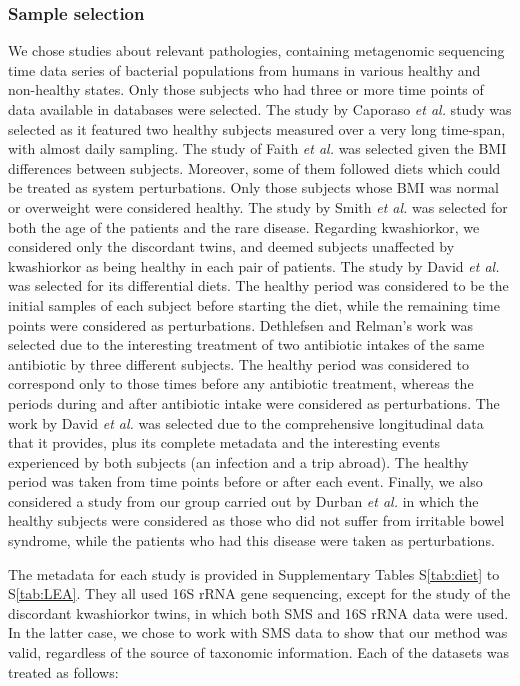 \subsubsection*{Sample selection}
We chose studies about relevant pathologies, containing metagenomic sequencing time data series of bacterial populations from humans in various healthy and non-healthy states. Only those subjects who had three or more time points of data available in databases were selected. The study by Caporaso \textit{et al.} study \cite{moving} was selected as it featured two healthy subjects measured over a very long time-span, with almost daily sampling. The study of Faith \textit{et al.} \cite{LEA} was selected given the BMI differences between subjects. Moreover, some of them followed diets which could be treated as system perturbations. Only those subjects whose BMI was normal or overweight were considered healthy. The study by Smith \textit{et al.} \cite{kwashiorkor} was selected for both the age of the patients and the rare disease. Regarding kwashiorkor, we considered only the discordant twins, and deemed subjects unaffected by kwashiorkor as being healthy in each pair of patients. The study by David \textit{et al.} \cite{diet} was selected for its differential diets. The healthy period  was considered to be the initial samples of each subject before starting the diet, while the remaining time points were considered as perturbations. Dethlefsen and Relman’s work \cite{antibiotic} was selected due to the interesting treatment of two antibiotic intakes of the same antibiotic by three different subjects. The healthy period was considered to correspond only to those times before any antibiotic treatment, whereas the periods during and after antibiotic intake were considered as perturbations. The work by David \textit{et al.} \cite{hostlife} was selected due to the comprehensive longitudinal data that it provides, plus its complete metadata and the interesting events experienced by both subjects (an infection and a trip abroad). The healthy period was taken from time points before or after each event. Finally, we also considered a study from our group carried out by Durban \textit{et al.} \cite{IBS} in which the healthy subjects were considered as those who did not suffer from irritable bowel syndrome, while the patients who had this disease were taken as perturbations. 

The metadata for each study is provided in Supplementary Tables S\ref{tab:diet} to S\ref{tab:LEA}. They all used 16S rRNA gene sequencing, except for the study of the discordant kwashiorkor twins\cite{kwashiorkor}, in which both SMS and 16S rRNA data were used. In the latter case, we chose to work with SMS data to show that our method was valid, regardless of the source of taxonomic information. Each of the datasets was treated as follows:

